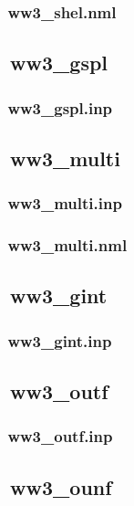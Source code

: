 \subsubsection{~ww3\_shel.nml} \label{sec:config082}
\vsssub
\vssub


\vssub
\subsection{~ww3\_gspl}
\vsssub
\subsubsection{~ww3\_gspl.inp} \label{sec:config091}
\vsssub
\vssub


\vssub
\subsection{~ww3\_multi}
\vsssub
\subsubsection{~ww3\_multi.inp} \label{sec:config101}
\vsssub
\vsssub
\subsubsection{~ww3\_multi.nml} \label{sec:config102}
\vsssub
\vssub


\vssub
\subsection{~ww3\_gint}
\vsssub
\subsubsection{~ww3\_gint.inp} \label{sec:config111}
\vsssub
\vssub


\vssub
\subsection{~ww3\_outf}
\vsssub
\subsubsection{~ww3\_outf.inp} \label{sec:config121}
\vsssub
\vssub


\vssub
\subsection{~ww3\_ounf}
\vsssub
